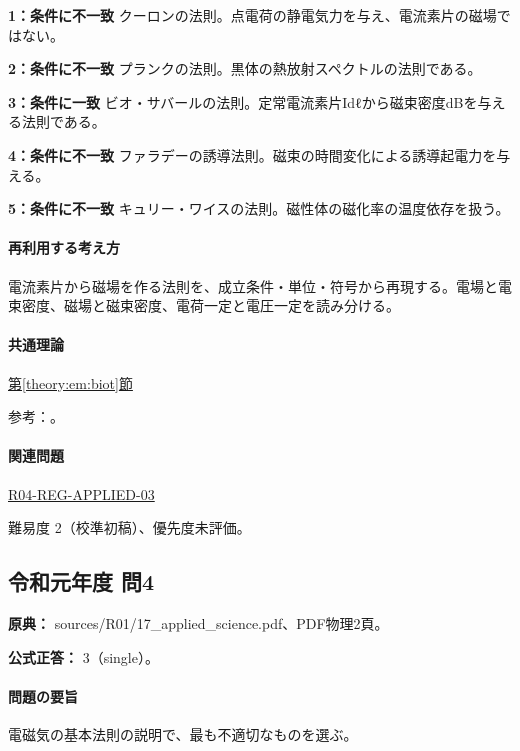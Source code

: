 \noindent\textbf{1：条件に不一致} クーロンの法則。点電荷の静電気力を与え、電流素片の磁場ではない。\par

\noindent\textbf{2：条件に不一致} プランクの法則。黒体の熱放射スペクトルの法則である。\par

\noindent\textbf{3：条件に一致} ビオ・サバールの法則。定常電流素片Idℓから磁束密度dBを与える法則である。\par

\noindent\textbf{4：条件に不一致} ファラデーの誘導法則。磁束の時間変化による誘導起電力を与える。\par

\noindent\textbf{5：条件に不一致} キュリー・ワイスの法則。磁性体の磁化率の温度依存を扱う。\par

\paragraph{再利用する考え方} 電流素片から磁場を作る法則を、成立条件・単位・符号から再現する。電場と電束密度、磁場と磁束密度、電荷一定と電圧一定を読み分ける。

\paragraph{共通理論} \hyperref[theory:em:biot]{第\ref*{theory:em:biot}節}

\par 参考：\cite{mit_em09}。

\paragraph{関連問題} \hyperref[q:r04-reg-applied-03]{R04-REG-APPLIED-03}

\par 難易度 2（校準初稿）、優先度未評価。

\subsection{令和元年度 問4}
\label{q:r01-reg-applied-04}

\noindent\textbf{原典：} sources/R01/17\_applied\_science.pdf、PDF物理2頁。

\textbf{公式正答：} 3（single）。

\paragraph{問題の要旨} 電磁気の基本法則の説明で、最も不適切なものを選ぶ。

